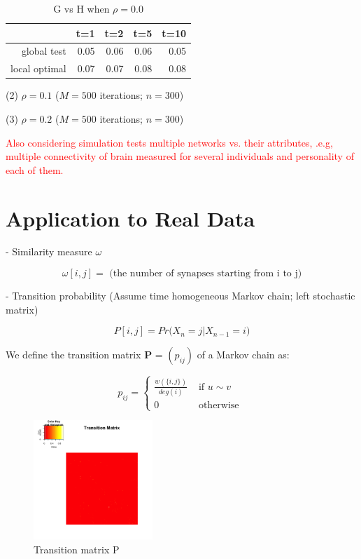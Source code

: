 \documentclass[12pt]{report}
\begin{document}
\begin{table}[ht]
\centering
\begin{tabular}{rrrrr}
  \hline
 & t=1 & t=2 & t=5 & t=10 \\ 
  \hline
global test & 0.05 & 0.06 & 0.06 & 0.05 \\ 
  local optimal & 0.07 & 0.07 & 0.08 & 0.08 \\ 
   \hline
\end{tabular}
\caption{G vs H when $\rho = 0.0$}
\end{table}


(2) $\rho = 0.1$ ($M = 500$ iterations; $n = 300$)

(3) $\rho = 0.2$ ($M = 500$ iterations; $n = 300$)

\textcolor{red}{Also considering simulation tests multiple networks vs. their attributes, .e.g, multiple connectivity of brain measured for several individuals and personality of each of them.}



\newpage
\section{Application to Real Data}

- Similarity measure $\omega$

$$\omega[i,j] = \mbox{ (the number of synapses starting from i to j)}$$
 

- Transition probability (Assume time homogeneous Markov chain; left stochastic matrix)

$$P[i,j] = Pr\big( X_{n} = j  | X_{n-1} = i \big)$$

We define the transition matrix \textbf{P} = $(p_{ij})$ of a Markov chain as:

$$p_{ij} = \left\{ \begin{array}{ll} \frac{w(\{ i, j\})}{ deg(i) } & \mbox{ if } u \sim v \\ 0 & \mbox{ otherwise }  \end{array}  \right.$$


\begin{figure}[H]
\captionsetup{format=plain}
\centering
\includegraphics[width=0.4\textwidth]{../figure/trans.png}
\caption{Transition matrix P}
\label{fig:trans}
\end{figure}
\end{document}
